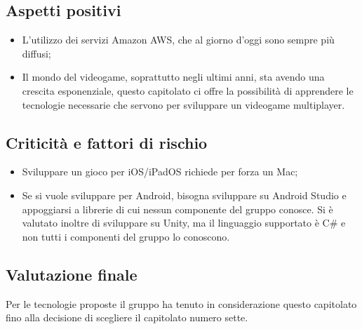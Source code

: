 \subsection{Aspetti positivi}
\begin{itemize}
\item L'utilizzo dei servizi Amazon AWS, che al giorno d'oggi sono sempre più diffusi;
\item Il mondo del videogame, soprattutto negli ultimi anni, sta avendo una crescita esponenziale, questo capitolato ci offre la possibilità di apprendere le tecnologie necessarie che servono per sviluppare un videogame multiplayer.
\end{itemize}

\subsection{Criticità e fattori di rischio}
\begin{itemize}
\item Sviluppare un gioco per iOS/iPadOS richiede per forza un Mac;
\item Se si vuole sviluppare per Android, bisogna sviluppare su Android Studio e appoggiarsi a librerie di cui nessun componente del gruppo conosce. 
Si è valutato inoltre di sviluppare su Unity, ma il linguaggio supportato è C\# e non tutti i componenti del gruppo lo conoscono.
\end{itemize}

\subsection{Valutazione finale}
Per le tecnologie proposte il gruppo \textit{\Gruppo{}} ha tenuto in considerazione questo capitolato fino alla decisione di scegliere il capitolato numero sette.
